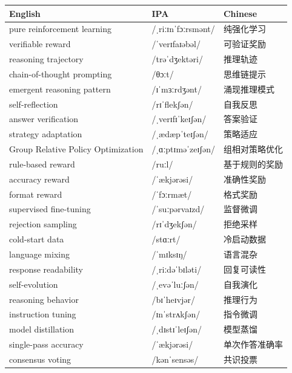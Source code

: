 \documentclass[UTF8,12pt,a4paper]{ctexart}
\providecommand{\zh}[1]{#1}
\begin{document}
\begin{tabular*}{\textwidth}{@{\extracolsep{\fill}}lll@{}}
\toprule
\textbf{English} & \textbf{IPA} & \textbf{Chinese} \\
\midrule
pure reinforcement learning & {\ipafont /ˌriːɪnˈfɔːrsmənt/} & \zh{纯强化学习} \\
verifiable reward & {\ipafont /ˈverɪfaɪəbəl/} & \zh{可验证奖励} \\
reasoning trajectory & {\ipafont /trəˈdʒektəri/} & \zh{推理轨迹} \\
chain-of-thought prompting & {\ipafont /θɔːt/} & \zh{思维链提示} \\
emergent reasoning pattern & {\ipafont /ɪˈmɜːrdʒənt/} & \zh{涌现推理模式} \\
self-reflection & {\ipafont /rɪˈflekʃən/} & \zh{自我反思} \\
answer verification & {\ipafont /ˌverɪfɪˈkeɪʃən/} & \zh{答案验证} \\
strategy adaptation & {\ipafont /ˌædæpˈteɪʃən/} & \zh{策略适应} \\
Group Relative Policy Optimization & {\ipafont /ˌɑːptɪməˈzeɪʃən/} & \zh{组相对策略优化} \\
rule-based reward & {\ipafont /ruːl/} & \zh{基于规则的奖励} \\
accuracy reward & {\ipafont /ˈækjərəsi/} & \zh{准确性奖励} \\
format reward & {\ipafont /ˈfɔːrmæt/} & \zh{格式奖励} \\
supervised fine-tuning & {\ipafont /ˈsuːpərvaɪzd/} & \zh{监督微调} \\
rejection sampling & {\ipafont /rɪˈdʒekʃən/} & \zh{拒绝采样} \\
cold-start data & {\ipafont /stɑːrt/} & \zh{冷启动数据} \\
language mixing & {\ipafont /ˈmɪksɪŋ/} & \zh{语言混杂} \\
response readability & {\ipafont /ˌriːdəˈbɪləti/} & \zh{回复可读性} \\
self-evolution & {\ipafont /ˌevəˈluːʃən/} & \zh{自我演化} \\
reasoning behavior & {\ipafont /bɪˈheɪvjər/} & \zh{推理行为} \\
instruction tuning & {\ipafont /ɪnˈstrʌkʃən/} & \zh{指令微调} \\
model distillation & {\ipafont /ˌdɪstɪˈleɪʃən/} & \zh{模型蒸馏} \\
single-pass accuracy & {\ipafont /ˈækjərəsi/} & \zh{单次作答准确率} \\
consensus voting & {\ipafont /kənˈsensəs/} & \zh{共识投票} \\

\end{tabular*}
\end{document}
